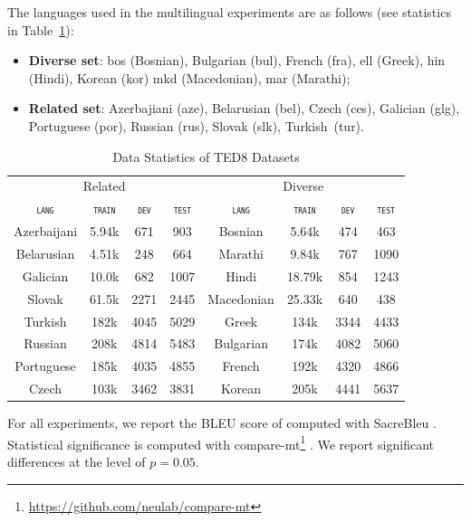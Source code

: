 \documentclass[11pt]{article}
\newcommand{\fyDone}[1]{\done[FY]\Todo[FY:]{\textcolor{orange}{#1}}}
\newcommand{\domain}[1]{\texttt{\textsc{#1}}}
\begin{document}
The languages used in the multilingual experiments are as follows (see statistics in Table~\ref{tab:Corpora-multilingual}):
\begin{itemize}
\item \textbf{Diverse set}: bos (Bosnian), Bulgarian (bul), French (fra), ell (Greek),
  hin (Hindi), Korean (kor) mkd (Macedonian), mar (Marathi);
\item \textbf{Related set}: Azerbajiani (aze), Belarusian (bel),
  Czech (ces), Galician (glg), Portuguese (por), Russian (rus), Slovak (slk), Turkish~(tur).
\end{itemize}

\begin{table}[h]
  \centering
  \begin{tabular}{|cccc||cccc|} 
  \hline
    \multicolumn{4}{|c||}{Related} & \multicolumn{4}{c|}{Diverse} \\
                            \multicolumn{1}{|c}{\domain{lang}} & \multicolumn{1}{c}{\domain{train}} & \multicolumn{1}{c}{\domain{dev}} & \multicolumn{1}{c||}{\domain{test}} & \multicolumn{1}{c}{\domain{lang}} & \multicolumn{1}{c}{\domain{train}} & \multicolumn{1}{c}{\domain{dev}} & \multicolumn{1}{c|}{\domain{test}} \\
    \hline 
    Azerbaijani & 5.94k & 671 & 903 & Bosnian & 5.64k & 474 & 463 \\
    Belarusian & 4.51k & 248 & 664 & Marathi & 9.84k & 767 & 1090\\
    Galician & 10.0k & 682 & 1007 & Hindi & 18.79k & 854 & 1243\\
    Slovak & 61.5k & 2271 & 2445 & Macedonian & 25.33k & 640 & 438 \\
    Turkish & 182k & 4045 & 5029 & Greek & 134k & 3344 & 4433\\
    Russian & 208k & 4814 & 5483 &  Bulgarian & 174k & 4082 & 5060 \\
    Portuguese & 185k & 4035 & 4855 & French & 192k & 4320 & 4866\\
    Czech & 103k & 3462 & 3831 & Korean & 205k & 4441 & 5637 \\
    \hline
  \end{tabular}
  \caption{Data Statistics of TED8 Datasets}
\label{tab:Corpora-multilingual}
\end{table}

For all experiments, we report the BLEU score of \citet{Papineni02bleu} computed with SacreBleu \citep{Post18call}. Statistical significance is computed with compare-mt\footnote{\url{https://github.com/neulab/compare-mt}} \cite{Neubig19compare-mt}. We report significant differences at the level of $p=0.05$.\fyDone{Check this}
\end{document}

